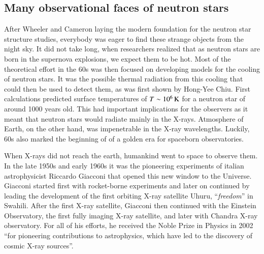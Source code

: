 \subsection{Many observational faces of neutron stars}

After Wheeler and Cameron laying the modern foundation for the neutron star structure studies, everybody was eager to find these strange objects from the night sky.
It did not take long, when researchers realized that as neutron stars are born in the supernova explosions, we expect them to be hot.
Most of the theoretical effort in the 60s was then focused on developing models for the cooling of neutron stars.\cite{Stabler60, Chiu64, Morton64, CS64, BW65a, BW65b, TC66}
It was the possible thermal radiation from this cooling that could then be used to detect them, as was first shown by Hong-Yee Chiu\cite{Chiu64}.
First calculations predicted surface temperatures of $T \sim 10^6 \, \mathrm{K}$ for a neutron star of around 1000 years old.
This had important implications for the observers as it meant that neutron stars would radiate mainly in the X-rays.
Atmosphere of Earth, on the other hand, was impenetrable in the X-ray wavelengths.
Luckily, 60s also marked the beginning of of a golden era for spaceborn observatories.

When X-rays did not reach the earth, humankind went to space to observe them.
In the late 1950s and early 1960s it was the pioneering experiments of italian astrophysicist Riccardo Giacconi that opened this new window to the Universe.
Giacconi started first with rocket-borne experiments and later on continued by leading the development of the first orbiting X-ray satellite Uhuru, ``\textit{freedom}'' in Swahili.\cite{GGP62}
After the first X-ray satellite, Giacconi then continued with the Einstein Observatory, the first fully imaging X-ray satellite, and later with Chandra X-ray observatory.
For all of his efforts, he received the Noble Prize in Physics in 2002 ``for pioneering contributions to astrophysics, which have led to the discovery of cosmic X-ray sources''.

